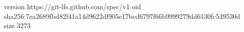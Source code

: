 version https://git-lfs.github.com/spec/v1
oid sha256:7ea2689fbd82f41a14d9622df905e17bed6797f66b9999279dd6130fc549530d
size 3273
